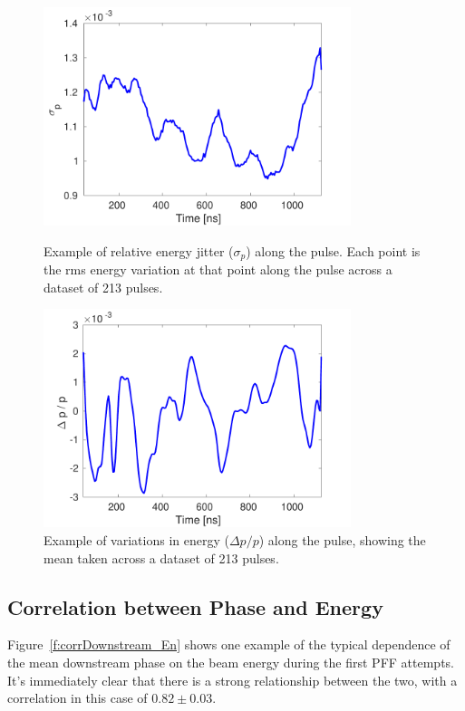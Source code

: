 \begin{figure}
  \centering
  \includegraphics[width=0.8\textwidth]{Figures/propagation/enJitter_along}
  \caption{Example of relative energy jitter (\(\sigma_p\)) along the pulse. Each point is the rms energy variation at that point along the pulse across a dataset of 213 pulses.}
  \label{f:enJitter_along}
  \includegraphics[width=0.8\textwidth]{Figures/propagation/enMeanAlong}
  \caption{Example of variations in energy (\(\Delta p/p\)) along the pulse, showing the mean taken across a dataset of 213 pulses.}
  \label{f:enMeanAlong}
\end{figure}



\subsection{Correlation between Phase and Energy}
\label{ss:corrPhaseEnergy}

Figure~\ref{f:corrDownstream_En} shows one example of the typical dependence of the mean downstream phase on the beam energy during the first PFF attempts. It's immediately clear that there is a strong relationship between the two, with a correlation in this case of \(0.82\pm0.03\). 

